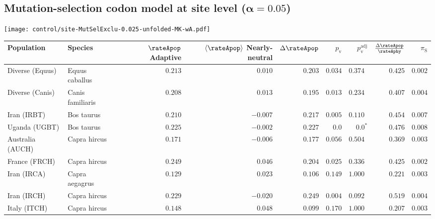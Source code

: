 \subsection{Mutation-selection codon model at site level ($\bm{\alpha=0.05}$)}
\begin{center}
    \texttt{[image: control/site-MutSelExclu-0.025-unfolded-MK-wA.pdf]}
    \begin{adjustbox}{width = 1\textwidth}
        \begin{tabular}{|l|l|r|r|r|r|r|r|r|}
            \toprule
            Population & Species & \specialcell{$\rateApop$ \\ Adaptive}                & \specialcell{$\left< \rateApop \right>$ \\ Nearly-neutral}                & $\Delta \rateApop $    & $p_{\mathrm{v}}$ & $p_{\mathrm{v}}^{\mathrm{adj}}$  & $\frac{\Delta\rateApop}{\rateAphy}$ & $\pi_{\textrm{S}}$ \\
            \midrule
            Diverse (Equus)                    & Equus caballus          & $ 0.213$ & $ 0.010$  & $ 0.203$ & $ 0.034$ & $ 0.374~~$        & $ 0.425$ & $ 0.002$ \\
            Diverse (Canis)                  & Canis familiaris          & $ 0.208$ & $ 0.013$  & $ 0.195$ & $ 0.013$    & $ 0.234~~$    & $ 0.407$ & $ 0.004$ \\
            Iran (IRBT)               & Bos taurus        & $ 0.210$ & $-0.007$  & $ 0.217$ & $ 0.005$ & $ 0.110~~$        & $ 0.454$ & $ 0.007$ \\
            Uganda (UGBT)                  & Bos taurus        & $ 0.225$ & $-0.002$  & $ 0.227$ & $0.0$ & $\bm{0.0{^*}}$        & $ 0.476$ & $ 0.008$ \\
            Australia (AUCH)                    & Capra hircus      & $ 0.171$ & $-0.006$  & $ 0.177$ & $ 0.056$ & $ 0.504~~$        & $ 0.369$ & $ 0.003$ \\
            France (FRCH)                    & Capra hircus        & $ 0.249$ & $ 0.046$  & $ 0.204$ & $ 0.025$ & $ 0.336~~$        & $ 0.425$ & $ 0.002$ \\
            Iran (IRCA)                   & Capra aegagrus        & $ 0.129$ & $ 0.023$  & $ 0.106$ & $ 0.149$ & $ 1.000~~$        & $ 0.221$ & $ 0.003$ \\
            Iran (IRCH)                 & Capra hircus        & $ 0.229$ & $-0.020$  & $ 0.249$ & $ 0.004$ & $ 0.092~~$        & $ 0.519$ & $ 0.004$ \\
            Italy (ITCH)                    & Capra hircus          & $ 0.148$ & $ 0.048$  & $ 0.099$ & $ 0.170$ & $ 1.000~~$ & $ 0.207$ & $ 0.003$ \\

\end{tabular}
\end{adjustbox}
\end{center}
